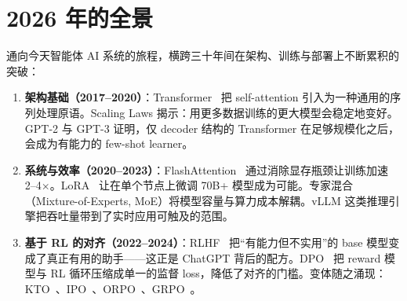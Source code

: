 \documentclass[11pt,a4paper,openany]{book}
\begin{document}
\section*{2026 年的全景}
\label{the-landscape-in-2026}

通向今天智能体 AI 系统的旅程，横跨三十年间在架构、训练与部署上不断累积的突破：

\begin{enumerate}
  \item \textbf{架构基础（2017--2020）}：Transformer~\cite{vaswani2017attention} 把 self-attention 引入为一种通用的序列处理原语。Scaling Laws 揭示：用更多数据训练的更大模型会稳定地变好。GPT-2 与 GPT-3 证明，仅 decoder 结构的 Transformer 在足够规模化之后，会成为有能力的 few-shot learner。
  \item \textbf{系统与效率（2020--2023）}：FlashAttention~\cite{dao2022flashattention} 通过消除显存瓶颈让训练加速 2--4$\times$。LoRA~\cite{hu2021lora} 让在单个节点上微调 70B+ 模型成为可能。专家混合（Mixture-of-Experts, MoE）将模型容量与算力成本解耦。vLLM 这类推理引擎把吞吐量带到了实时应用可触及的范围。
  \item \textbf{基于 RL 的对齐（2022--2024）}：RLHF~\cite{ouyang2022training} 把“有能力但不实用”的 base 模型变成了真正有用的助手——这正是 ChatGPT 背后的配方。DPO~\cite{rafailov2023direct} 把 reward 模型与 RL 循环压缩成单一的监督 loss，降低了对齐的门槛。变体随之涌现：KTO~\cite{ethayarajh2024kto}、IPO~\cite{azar2024general}、ORPO~\cite{hong2024orpo}、GRPO~\cite{shao2024deepseekmath}。

\end{enumerate}
\end{document}
